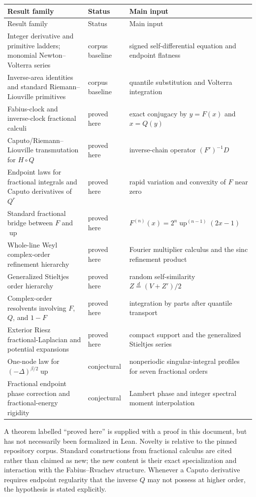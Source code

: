 \documentclass[11pt,oneside]{article}
\numberwithin{equation}{section}
\theoremstyle{plain}
\theoremstyle{definition}
\theoremstyle{remark}
\newcommand{\Up}{\operatorname{up}}
\begin{document}
\begin{longtable}{@{}p{}p{}p{}@{}}
\toprule
Result family & Status & Main input \\
\midrule
\endfirsthead
\toprule
Result family & Status & Main input \\
\midrule
\endhead
Integer derivative and primitive ladders; monomial Newton--Volterra series
& corpus baseline & signed self-differential equation and endpoint flatness\\
Inverse-area identities and standard Riemann--Liouville primitives
& corpus baseline & quantile substitution and Volterra integration\\
Fabius-clock and inverse-clock fractional calculi
& proved here & exact conjugacy by $y=F(x)$ and $x=Q(y)$\\
Caputo/Riemann--Liouville transmutation for $H\circ Q$
& proved here & inverse-chain operator $(F')^{-1}D$\\
Endpoint laws for fractional integrals and Caputo derivatives of $Q^r$
& proved here & rapid variation and convexity of $F$ near zero\\
Standard fractional bridge between $F$ and $\Up$
& proved here & $F^{(n)}(x)=2^n\Up^{(n-1)}(2x-1)$\\
Whole-line Weyl complex-order refinement hierarchy
& proved here & Fourier multiplier calculus and the sinc refinement product\\
Generalized Stieltjes order hierarchy
& proved here & random self-similarity $Z\overset d=(V+Z')/2$\\
Complex-order resolvents involving $F$, $Q$, and $1-F$
& proved here & integration by parts after quantile transport\\
Exterior Riesz fractional-Laplacian and potential expansions
& proved here & compact support and the generalized Stieltjes series\\
One-node law for $(-\Delta)^{\beta/2}\Up$
& conjectural & nonperiodic singular-integral profiles for seven fractional orders\\
Fractional endpoint phase correction and fractional-energy rigidity
& conjectural & Lambert phase and integer spectral moment interpolation\\
\bottomrule
\end{longtable}

\begin{warningbox}
A theorem labelled ``proved here'' is supplied with a proof in this document,
but has not necessarily been formalized in Lean.  Novelty is relative to the
pinned repository corpus.  Standard constructions from fractional calculus
are cited rather than claimed as new; the new content is their exact
specialization and interaction with the Fabius--Rvachev structure.  Whenever
a Caputo derivative requires endpoint regularity that the inverse $Q$ may not
possess at higher order, the hypothesis is stated explicitly.
\end{warningbox}
\end{document}
